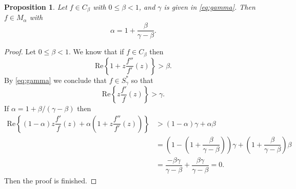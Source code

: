 \documentclass[reqno]{amsart}
\theoremstyle{plain}
\newtheorem{prop}[theo]{Proposition}
\theoremstyle{definition}
\begin{document}
\begin{prop}\label{prop_alpha}
Let \( f\in C_\beta \) with \(0 \leq \beta <1 \), and  \( \gamma \) is given in \eqref{eq:gamma}. Then \( f\in M_\alpha \) with
\[\alpha=1+\dfrac{\beta}{\gamma-\beta}.\]
\end{prop}
\begin{proof}
    Let \(0\leq \beta <1 \). We know that if \( f\in C_\beta\) then
    \[\text{Re}\left\{1+z\dfrac{f''}{f'}(z)\right\}>\beta.\]
    By \eqref{eq:gamma} we conclude that \( f\in S^*_\gamma \) so that
    \[\text{Re}\left\{z\dfrac{f'}{f}(z)\right\}>\gamma. \]
    If \( \alpha=1+\beta/(\gamma-\beta) \) then
    \begin{align*}
      \text{Re}\left\{(1-\alpha)z\dfrac{f'}{f}(z)+\alpha\left(1+z\dfrac{f''}{f'}(z)\right)\right\}& > (1-\alpha)\gamma+\alpha\beta\\
      & =\left(1-\left(1+\dfrac{\beta}{\gamma-\beta}\right)\right)\gamma+\left(1+\dfrac{\beta}{\gamma-\beta}\right)\beta\\
      & = \dfrac{-\beta\gamma}{\gamma-\beta}+\dfrac{\beta\gamma}{\gamma-\beta}=0.
    \end{align*}
Then the proof is finished.
\end{proof}
\end{document}

